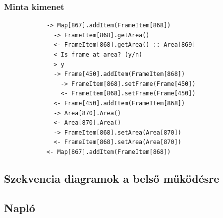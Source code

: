 		\subsubsection*{Minta kimenet}
			\begin{verbatim}
			-> Map[867].addItem(FrameItem[868])
			  -> FrameItem[868].getArea()
			  <- FrameItem[868].getArea() :: Area[869]
			  < Is frame at area? (y/n)
			  > y
			  -> Frame[450].addItem(FrameItem[868])
			    -> FrameItem[868].setFrame(Frame[450])
			    <- FrameItem[868].setFrame(Frame[450])
			  <- Frame[450].addItem(FrameItem[868])
			  -> Area[870].Area()
			  <- Area[870].Area()
			  -> FrameItem[868].setArea(Area[870])
			  <- FrameItem[868].setArea(Area[870])
			<- Map[867].addItem(FrameItem[868])
			\end{verbatim}
	
	\subsection{Szekvencia diagramok a belső működésre}
	
	\subsection{Napló}

